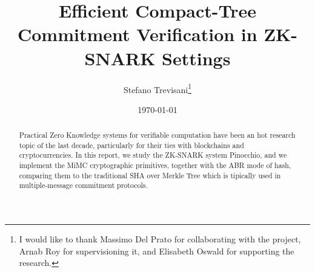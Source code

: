 \documentclass{article}
\author{Stefano Trevisani\footnote{I would like to thank Massimo Del Prato for collaborating 
with the project, Arnab Roy for supervisioning it, and Elisabeth Oswald for supporting the research.}}
\date{\today}
\title{Efficient Compact-Tree Commitment Verification in ZK-SNARK Settings}
\theoremstyle{definition}
\theoremstyle{theorem}
\theoremstyle{example}
\begin{document}
\maketitle
\begin{abstract}
	Practical Zero Knowledge systems for verifiable computation have been an hot research topic
	of the last decade, particularly for their ties with blockchains and cryptocurrencies.
	In this report, we study the ZK-SNARK system Pinocchio, and we implement the MiMC cryptographic
	primitives, together with the ABR mode of hash, comparing them to the traditional SHA over Merkle
	Tree which is tipically used in multiple-message commitment protocols.
\end{abstract}
\clearpage
\tableofcontents








\end{document}
